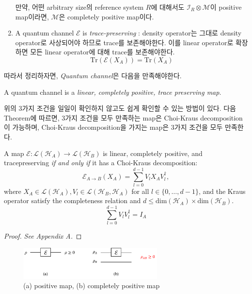 \begin{enumerate}
\begin{definition}
        만약, 어떤 arbitrary size의 reference system $R$에 대해서도 $\mathcal{I}_R \otimes \mathcal{M}$이 positive map이라면, $\mathcal{M}$은 completely positive map이다.
    \end{definition}
    \item A quantum channel $\mathcal E$ is \textit{trace-preserving} : density operator는 그대로 density operator로 사상되어야 하므로 trace를 보존해야한다. 이를 linear operator로 확장하면 모든 linear operator에 대해 trace를 보존해야한다.
    \begin{equation*}
        \text{Tr}\left(\mathcal E\left(X_A\right)\right) = \text{Tr}\left(X_A\right)
    \end{equation*}
\end{enumerate}

따라서 정리하자면, \textit{Quantum channel}은 다음을 만족해야한다. 
\begin{definition}
    A quantum channel is a \textit{linear, completely positive, trace preserving map}.
\end{definition}

\vspace{0.6em}

위의 3가지 조건을 일일이 확인하지 않고도 쉽게 확인할 수 있는 방법이 있다. 다음 Theorem에 따르면, 3가지 조건을 모두 만족하는 map은 Choi-Kraus decomposition이 가능하며, Choi-Kraus decomposition을 가지는 map은 3가지 조건을 모두 만족한다.
\begin{theorem}\label{thm:Choi-Kraus}
    A map $\mathcal{E}: \mathcal{L}\left(\mathcal{H}_A\right) \rightarrow \mathcal{L}\left(\mathcal{H}_B\right)$ is linear, completely positive, and tracepreserving \textit{if and only if} it has a Choi-Kraus decomposition:
    $$ \mathcal{E}_{A \rightarrow B}\left(X_A\right)=\sum_{l=0}^{d-1} V_l X_A V_l^{\dagger}, $$
    where $X_A \in \mathcal{L}\left(\mathcal{H}_A\right), V_l \in \mathcal{L}\left(\mathcal{H}_B, \mathcal{H}_A\right)$ for all $l \in\{0, \ldots, d-1\}$,
    and the Kraus operator satisfy the completeness relation and $d \le \text{dim}\left(\mathcal{H}_A\right) \times \text{dim}\left(\mathcal{H}_B\right)$.
    $$\sum_{l=0}^{d-1} V_l V_l^{\dagger}=I_A$$
\end{theorem}
\begin{proof}
    \textit{See Appendix A.}
\end{proof}

\begin{figure}[h]
    \centering
    \vspace{0.5em}
    \includegraphics[width=0.65\textwidth]{figures/positive.pdf}
    \caption{(a) positive map, (b) completely positive map}
    \label{fig:positive}
\end{figure}

